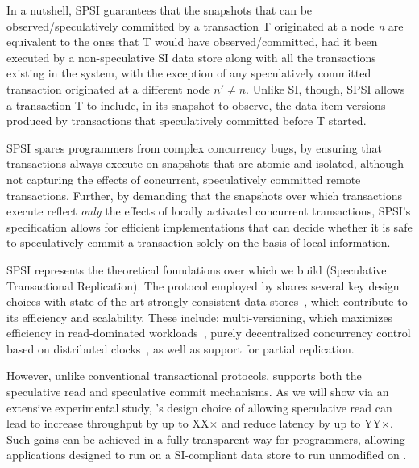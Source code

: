 In a nutshell, SPSI guarantees that the snapshots that can be observed/speculatively committed by a transaction T originated at a node \textit{n}
 are equivalent to the ones that T would have observed/committed, had it been executed by a non-speculative SI data store along with all the transactions existing in the system, with the exception of any speculatively committed transaction originated at a different node $n'\neq n$. Unlike SI, though, SPSI allows a transaction T to include, in its snapshot to observe, the data item versions produced by transactions that speculatively committed before T started.
 
SPSI  spares programmers from complex concurrency bugs, by ensuring that  transactions always execute on snapshots that are atomic and isolated, although not capturing the effects of concurrent, speculatively committed remote transactions. Further, by demanding that the snapshots over which transactions execute reflect \textit{only} the effects of locally activated concurrent transactions, SPSI's specification allows for efficient implementations that can decide whether it is safe to speculatively commit a transaction solely on the basis of local information.


SPSI represents the theoretical foundations over which we build \specula (Speculative Transactional Replication). The protocol employed by \specula  shares several key design choices with state-of-the-art strongly consistent data stores~\cite{spanner,clocksi,peluso2012score}, which contribute to its efficiency and scalability. These include:  multi-versioning, which maximizes efficiency in read-dominated workloads~\cite{bernstein1987concurrency},  purely decentralized concurrency control based on distributed clocks~\cite{spanner,clocksi,peluso2012scalability}, as well as support for partial replication. 

However, unlike conventional transactional protocols, \specula supports both 
the speculative read and speculative commit mechanisms. As we will show via an extensive experimental study, \specula's design choice of allowing speculative read can lead to increase throughput by up to XX$\times$ and reduce latency by up to YY$\times$. Such gains can be achieved in a fully transparent way for programmers, allowing applications designed to run on a SI-compliant data store to run unmodified on \specula.

